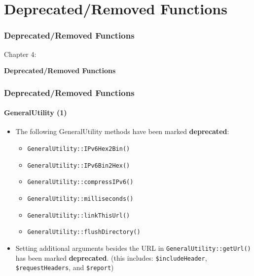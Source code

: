 %

\section{Deprecated/Removed Functions}
\begin{frame}[fragile]
	\frametitle{Deprecated/Removed Functions}

	\begin{center}\huge{Chapter 4:}\end{center}
	\begin{center}\huge{\color{typo3darkgrey}\textbf{Deprecated/Removed Functions}}\end{center}

\end{frame}


\begin{frame}[fragile]
	\frametitle{Deprecated/Removed Functions}
	\framesubtitle{GeneralUtility (1)}

	\begin{itemize}
		\item The following GeneralUtility methods have been marked \textbf{deprecated}:
			\begin{itemize}\smaller
				\item \texttt{GeneralUtility::IPv6Hex2Bin()}
				\item \texttt{GeneralUtility::IPv6Bin2Hex()}
				\item \texttt{GeneralUtility::compressIPv6()}
				\item \texttt{GeneralUtility::milliseconds()}
				\item \texttt{GeneralUtility::linkThisUrl()}
				\item \texttt{GeneralUtility::flushDirectory()}
			\end{itemize}\normalsize
			\vspace{0.4cm}

		\item Setting additional arguments besides the URL in \texttt{GeneralUtility::getUrl()}
			has been marked \textbf{deprecated}.\newline
			\smaller
				(this includes: \texttt{\$includeHeader}, \texttt{\$requestHeaders}, and \texttt{\$report})
			\normalsize

	\end{itemize}

\end{frame}

